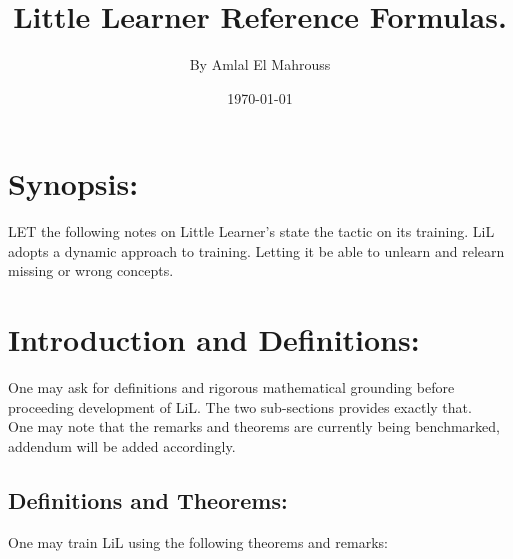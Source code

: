 \documentclass[10pt]{article}
\title{%
	\vspace{-1.5em}%
	\large\textbf{Little Learner Reference Formulas.}%
}
\author{By Amlal El Mahrouss}
\date{\today}
\theoremstyle{plain}
\theoremstyle{definition}
\theoremstyle{remark}
\begin{document}

\maketitle
\tableofcontents
\newpage

\section{Synopsis:}

\lettrine[lines=1, lhang=0.1, loversize=0.2]{L}ET the following notes on Little Learner's state the tactic on its training. LiL adopts a dynamic approach to training. Letting it be able to unlearn and relearn missing or wrong concepts.

\section{Introduction and Definitions:}

One may ask for definitions and rigorous mathematical grounding before proceeding development of LiL. The two sub-sections provides exactly that.\\
One may note that the remarks and theorems are currently being benchmarked, addendum will be added accordingly.

\subsection{Definitions and Theorems:}

One may train LiL using the following theorems and remarks:
\end{document}
